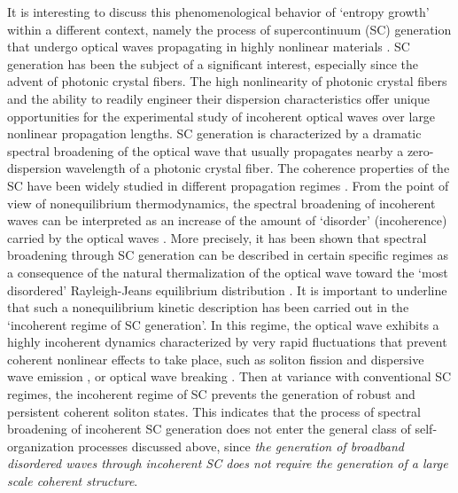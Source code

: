 \documentclass[pra,twocolumn,showpacs,preprintnumbers,amsmath,amssymb]{revtex4}
\begin{document}
It is interesting to discuss this phenomenological behavior of `entropy growth' within a different context, namely the process of supercontinuum (SC) generation that undergo optical waves propagating in highly nonlinear materials \cite{dudley06,skryabin10,dudley_book,agrawal}.
SC generation has been the subject of a significant interest, especially since the advent of photonic crystal fibers.
The high nonlinearity of photonic crystal fibers and the ability to readily engineer their dispersion characteristics offer unique opportunities for the experimental study of incoherent optical waves over large nonlinear propagation lengths. 
SC generation is characterized by a dramatic spectral broadening of the optical wave that usually propagates nearby a zero-dispersion wavelength of a photonic crystal fiber. 
The coherence properties of the SC have been widely studied in different propagation regimes \cite{dudley06,dudley_book,agrawal,genty1,genty2}.
From the point of view of nonequilibrium thermodynamics, the spectral broadening of incoherent waves can be interpreted as an increase of the amount of `disorder' (incoherence) carried by the  optical waves \cite{PR14}.
More precisely, it has been shown that spectral broadening through SC generation can be described in certain specific regimes  as a consequence of the natural thermalization of the optical wave toward the `most disordered' Rayleigh-Jeans  equilibrium distribution \cite{OE09,PRA09,PRA13}. 
It is important to underline that such a nonequilibrium kinetic description has been carried out in the `incoherent regime of SC generation'.
In this regime, the optical wave exhibits a highly incoherent dynamics characterized by very rapid fluctuations that prevent coherent nonlinear effects to take place, such as soliton fission and dispersive wave emission \cite{dudley06,skryabin10,dudley_book,agrawal,
hydro_sc,erkintalo12,silvestre,shalva}, or optical wave breaking \cite{finot08,confortiPRA14,silvestre,heidt17}.
Then at variance with conventional SC regimes, the incoherent regime of SC prevents the  generation of robust and persistent coherent soliton states.
This indicates that the process of spectral broadening of incoherent SC generation does not enter the general class of self-organization processes discussed above, since {\it the generation of broadband disordered waves through incoherent SC does not require the generation of a large scale coherent structure}.
\end{document}

